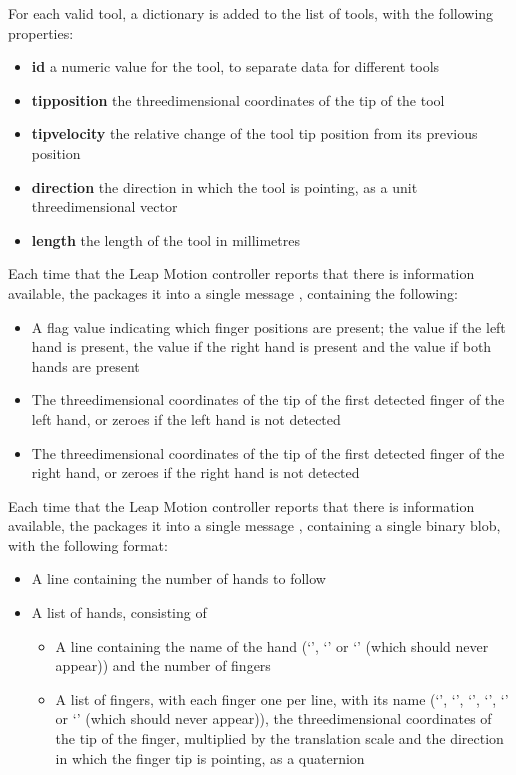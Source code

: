 For each valid tool, a dictionary is added to the list of tools, with the following
properties:
\begin{itemize}
\item\textbf{id} \longDash{} a numeric value for the tool, to separate data for different
tools
\item\exSp\textbf{tipposition} \longDash{} the three\longDash{}dimensional coordinates of
the tip of the tool
\item\exSp\textbf{tipvelocity} \longDash{} the relative change of the tool tip position
from its previous position
\item\exSp\textbf{direction} \longDash{} the direction in which the tool is pointing, as a
unit three\longDash{}dimensional vector
\item\exSp\textbf{length} \longDash{} the length of the tool in millimetres
\end{itemize}
\primaryEnd
{}
Each time that the Leap Motion controller reports that there is information available,
the  packages it into a single message
\openSq{}\closeSq, containing the following:
\begin{itemize}
\item A flag value indicating which finger positions are present; the value  if
the left hand is present, the value  if the right hand is present and the value
 if both hands are present
\item\exSp{}The three\longDash{}dimensional coordinates of the tip of the first detected
finger of the left hand, or zeroes if the left hand is not detected
\item\exSp{}The three\longDash{}dimensional coordinates of the tip of the first detected
finger of the right hand, or zeroes if the right hand is not detected
\end{itemize}
\primaryEnd
{}
Each time that the Leap Motion controller reports that there is information available,
the  packages it into a single message
\openSq{}\closeSq, containing a single binary blob, with the following
format:
\begin{itemize}
\item A line containing the number of hands to follow
\item\exSp{}A list of hands, consisting of
\begin{itemize}
\item A line containing the name of the hand (`', `' or
`' (which should never appear)) and the number of fingers
\item\exSp{}A list of fingers, with each finger one per line, with its name
(`', `', `', `', `'
or `' (which should never appear)), the three\longDash{}dimensional
coordinates of the tip of the finger, multiplied by the translation scale and the
direction in which the finger tip is pointing, as a quaternion
\end{itemize}
\end{itemize}
